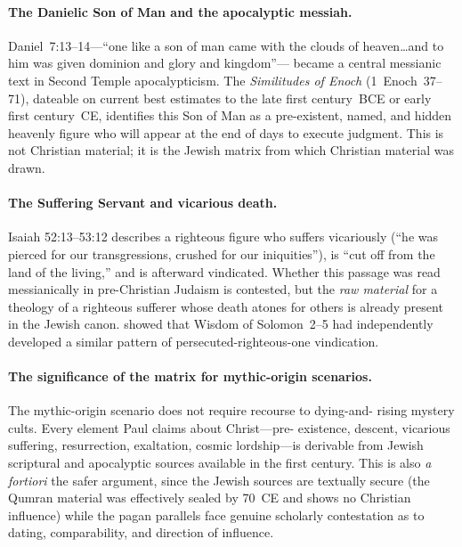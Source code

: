 \documentclass[12pt,oneside]{article}
\begin{document}
\paragraph{The Danielic Son of Man and the apocalyptic messiah.}
Daniel~7:13--14---\enquote{one like a son of man came with the clouds
of heaven\ldots and to him was given dominion and glory and kingdom}---
became a central messianic text in Second Temple apocalypticism.
The \textit{Similitudes of Enoch} (1~Enoch~37--71), dateable on
current best estimates to the late first century~BCE or early first
century~CE, identifies this Son of Man as a pre-existent, named, and
hidden heavenly figure who will appear at the end of days to execute
judgment.  This is not Christian material; it is the Jewish matrix
from which Christian material was drawn.

\paragraph{The Suffering Servant and vicarious death.}
Isaiah 52:13--53:12 describes a righteous figure who suffers vicariously
(\enquote{he was pierced for our transgressions, crushed for our
iniquities}), is \enquote{cut off from the land of the living,} and is
afterward vindicated.  Whether this passage was read messianically in
pre-Christian Judaism is contested, but the \textit{raw material} for a
theology of a righteous sufferer whose death atones for others is
already present in the Jewish canon.  \citet{Nickelsburg1972} showed
that Wisdom of Solomon~2--5 had independently developed a similar
pattern of persecuted-righteous-one vindication.

\paragraph{The significance of the matrix for mythic-origin
scenarios.}
The mythic-origin scenario does not require recourse to dying-and-
rising mystery cults.  Every element Paul claims about Christ---pre-
existence, descent, vicarious suffering, resurrection, exaltation,
cosmic lordship---is derivable from Jewish scriptural and apocalyptic
sources available in the first century.  This is also \textit{a
fortiori} the safer argument, since the Jewish sources are textually
secure (the Qumran material was effectively sealed by 70~CE and
shows no Christian influence) while the pagan parallels face genuine
scholarly contestation as to dating, comparability, and direction of
influence.
\end{document}
